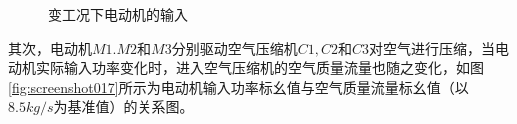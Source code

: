 \documentclass[journal,onecolumn]{IEEEtran}
\begin{document}
\begin{figure}[ht]
	\caption{变工况下电动机的输入} %
	\label{fig:7}  %
\end{figure}

其次，电动机$ M1.M2 $和$ M3 $分别驱动空气压缩机$ C1,C2 $和$ C3 $对空气进行压缩，当电动机实际输入功率变化时，进入空气压缩机的空气质量流量也随之变化，如图\ref{fig:screenshot017}所示为电动机输入功率标幺值与空气质量流量标幺值（以$ 8.5kg/s $为基准值）的关系图。
\end{document}
